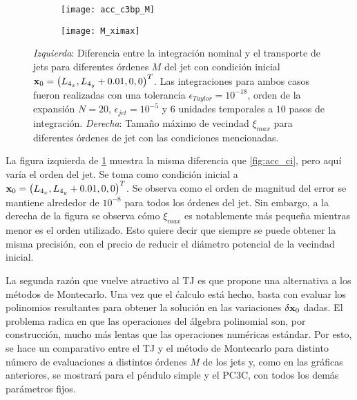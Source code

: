 \begin{figure}[h!]
\centering
\begin{subfigure}{0.49\textwidth}
	\centering
	\texttt{[image: acc\_c3bp\_M]}
\end{subfigure}
%
\begin{subfigure}{0.49\textwidth}
	\centering
	\texttt{[image: M\_ximax]}
\end{subfigure}
\caption{ \textit{Izquierda}: Diferencia entre la integración nominal y el transporte de jets para diferentes órdenes $M$ del jet con condición inicial $\mathbf{x}_0 =\left(L_{4_x}, L_{4_y} + 0.01, 0, 0 \right)^T$. Las integraciones para ambos casos fueron realizadas con una tolerancia $\epsilon_{Taylor} = 10^{-18}$, orden de la expansión $N=20$, $\epsilon_{jet} = 10^{-5}$ y $6$ unidades temporales a $10$ pasos de integración. \textit{Derecha}: Tamaño máximo de vecindad $\xi_{max}$ para diferentes órdenes de jet con las condiciones mencionadas.}
\label{fig:acc_M}
\end{figure}

La figura izquierda de \ref{fig:acc_M} muestra la misma diferencia que \ref{fig:acc_ci}, pero aquí varía el orden del jet. Se toma como condición inicial a $\mathbf{x}_0 =\left(L_{4_x}, L_{4_y} + 0.01, 0, 0 \right)^T$.  Se observa como el orden de magnitud del error se mantiene alrededor de $10^{-8}$ para todos los órdenes del jet. Sin embargo, a la derecha de la figura se observa cómo $\xi_{max}$ es notablemente más pequeña mientras menor es el orden utilizado. Esto quiere decir que siempre se puede obtener la misma precisión, con el precio de reducir el diámetro potencial de la vecindad inicial.
 
La segunda razón que vuelve atractivo al TJ es que propone una alternativa a los métodos de Montecarlo. Una vez que el ćalculo está hecho, basta con evaluar los polinomios resultantes para obtener la solución en las variaciones $\delta \mathbf{x}_0$ dadas. El problema radica en que las operaciones del álgebra polinomial son, por construcción, mucho más lentas que las operaciones numéricas estándar. Por esto, se hace un comparativo entre el TJ y el método de Montecarlo para distinto número de evaluaciones a distintos órdenes $M$ de los jets y, como en las gráficas anteriores, se mostrará para el péndulo simple y el PC3C, con todos los demás parámetros fijos.

